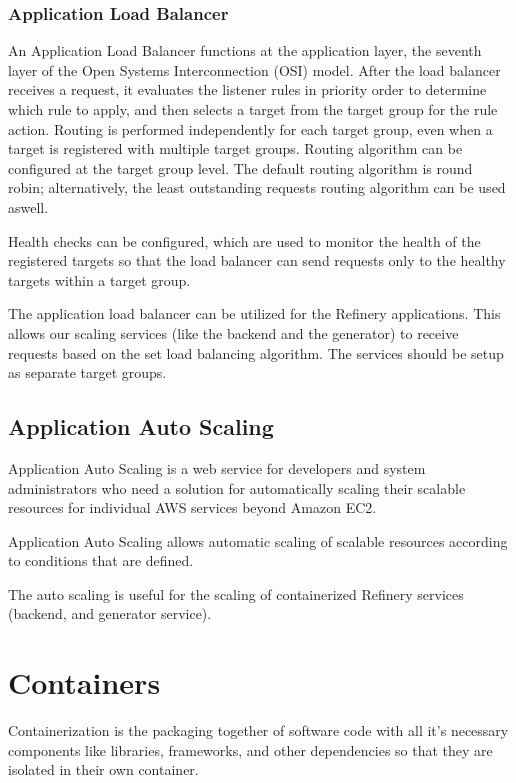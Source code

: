 		\subsubsection{Application Load Balancer}
			An Application Load Balancer \cite{elb} functions at the application layer, the seventh layer of the Open Systems Interconnection (OSI)
			model. After the load balancer receives a request, it evaluates the listener rules in priority order to determine which 
			rule to apply, and then selects a target from the target group for the rule action. 
			Routing is performed independently for each target group, even when a target is registered with multiple target groups. 
			Routing algorithm can be configured at the target group level. 
			The default routing algorithm is round robin; alternatively, the least outstanding requests routing algorithm can be used aswell.

			Health checks can be configured, which are used to monitor the health of the registered targets so that the 
			load balancer can send requests only to the healthy targets within a target group.

			The application load balancer can be utilized for the Refinery applications. This allows our scaling services (like the backend and 
			the generator) to receive requests based on the set load balancing algorithm. The services should be setup as separate target groups.

	\subsection{Application Auto Scaling}
		Application Auto Scaling \cite{autoscale} is a web service for developers and system administrators 
		who need a solution for automatically scaling their scalable resources for individual AWS services beyond Amazon EC2. 

		Application Auto Scaling allows automatic scaling of scalable resources according to conditions that are defined.

		The auto scaling is useful for the scaling of containerized Refinery services (backend, and generator service).

\section{Containers}
	Containerization \cite{container} is the packaging together of software code with all it’s necessary 
	components like 
	libraries, frameworks, and other dependencies so that they are isolated in their own container.
	
